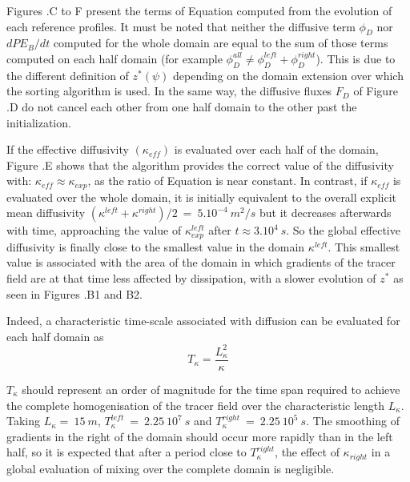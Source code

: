 Figures .C to F present the terms of Equation  computed from the evolution of each reference profiles. It must be noted that neither the diffusive term $\phi_D$ nor $dPE_B/dt$ computed for the whole domain are equal to the sum of those terms computed on each half domain (for example $\phi_D^{all} \ne \phi_D^{left}+\phi_D^{right}$). This is due to the different definition of $z^*(\psi)$ depending on the domain extension over which the sorting algorithm is used. In the same way, the diffusive fluxes $F_D$ of Figure .D do not cancel each other from one half domain to the other past the initialization.%

If the effective diffusivity $(\kappa_{eff})$ is evaluated over each half of the domain, Figure .E shows that the algorithm provides the correct value of the diffusivity with: $\kappa_{eff}\approx\kappa_{exp}$, as the ratio of Equation  is near constant. In contrast, if $\kappa_{eff}$ is evaluated over the whole domain, it is initially equivalent to the overall explicit mean diffusivity $(\kappa^{left}+\kappa^{right})/2\ =\ 5.10^{-4}\ m^2/s$ but it decreases afterwards with time, approaching the value of $\kappa_{exp}^{left}$ after $t \approx 3.10^4\ s$. So the global effective diffusivity is finally close to the smallest value in the domain $\kappa^{left}$. This smallest value is associated with the area of the domain in which gradients of the tracer field are at that time less affected by dissipation, with a slower evolution of $z^*$ as seen in Figures .B1 and B2.

\color{red}Indeed, a characteristic time-scale associated with diffusion can be evaluated for each half domain as 
\begin{equation}
    T_{\kappa}=\frac{L_\kappa^2}{\kappa}
\end{equation}

$T_{\kappa}$ should represent an order of magnitude for the time span required to achieve the complete homogenisation of the tracer field over the characteristic length $L_{\kappa}$. Taking $L_{\kappa}=\ 15\ m$, $T^{left}_{\kappa}\ =\ 2.25\ 10^7\ s$ and $T^{right}_{\kappa}\ =\ 2.25\ 10^5\ s$. The smoothing of gradients in the right of the domain should occur more rapidly than in the left half, so it is expected that after a period close to $T^{right}_{\kappa}$, the effect of $\kappa_{right}$ in a global evaluation of mixing over the complete domain is negligible.
\color{black}

